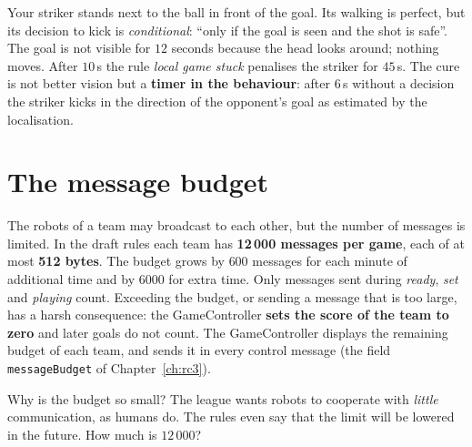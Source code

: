 \begin{example}
Your striker stands next to the ball in front of the goal. Its walking is perfect, but its decision to kick is \emph{conditional}: ``only if the goal is seen and the shot is safe''. The goal is not visible for $12$ seconds because the head looks around; nothing moves. After $10$\,s the rule \emph{local game stuck} penalises the striker for $45$\,s. The cure is not better vision but a \textbf{timer in the behaviour}: after $6$\,s without a decision the striker kicks in the direction of the opponent's goal as estimated by the localisation.
\end{example}

\section*{The message budget}
The robots of a team may broadcast to each other, but the number of messages is limited. In the draft rules each team has \textbf{12\,000 messages per game}, each of at most \textbf{512 bytes}. The budget grows by $600$ messages for each minute of additional time and by $6000$ for extra time. Only messages sent during \emph{ready}, \emph{set} and \emph{playing} count. Exceeding the budget, or sending a message that is too large, has a harsh consequence: the GameController \textbf{sets the score of the team to zero} and later goals do not count. The GameController displays the remaining budget of each team, and sends it in every control message (the field \verb!messageBudget! of Chapter~\ref{ch:rc3}).

Why is the budget so small? The league wants robots to cooperate with \emph{little} communication, as humans do. The rules even say that the limit will be lowered in the future. How much is $12\,000$?

\begin{center}
\end{center}

